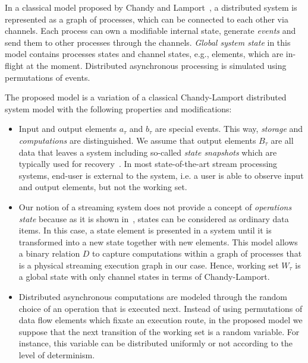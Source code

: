 In a classical model proposed by Chandy and Lamport~\cite{Chandy:1985:DSD:214451.214456}, a distributed system is represented as a graph of processes, which can be connected to each other via channels. Each process can own a modifiable internal state, generate {\em events} and send them to other processes through the channels. {\em Global system state} in this model contains processes states and channel states, e.g., elements, which are in-flight at the moment. Distributed asynchronous processing is simulated using permutations of events.

The proposed model is a variation of a classical Chandy-Lamport distributed system model with the following properties and modifications:

\begin{itemize}
    \item Input and output elements $a_\tau$ and $b_\tau$ are special events. This way, {\em storage} and {\em computations} are distinguished. We assume that output elements $B_\tau$ are all data that leaves a system including so-called {\em state snapshots} which are typically used for recovery~\cite{Carbone:2017:SMA:3137765.3137777}. In most state-of-the-art stream processing systems, end-user is external to the system, i.e. a user is able to observe input and output elements, but not the working set.
    \item Our notion of a streaming system does not provide a concept of {\em operations state} because as it is shown in~\cite{we2018adbis}, states can be considered as ordinary data items. In this case, a state element is presented in a system until it is transformed into a new state together with new elements. This model allows a binary relation $D$ to capture computations within a graph of processes that is a physical streaming execution graph in our case. Hence, working set $W_\tau$ is a global state with only channel states in terms of Chandy-Lamport.
    \item Distributed asynchronous computations are modeled through the random choice of an operation that is executed next. Instead of using permutations of data flow elements which fixate an execution route, in the proposed model we suppose that the next transition of the working set is a random variable. For instance, this variable can be distributed uniformly or not according to the level of determinism. 
\end{itemize}


